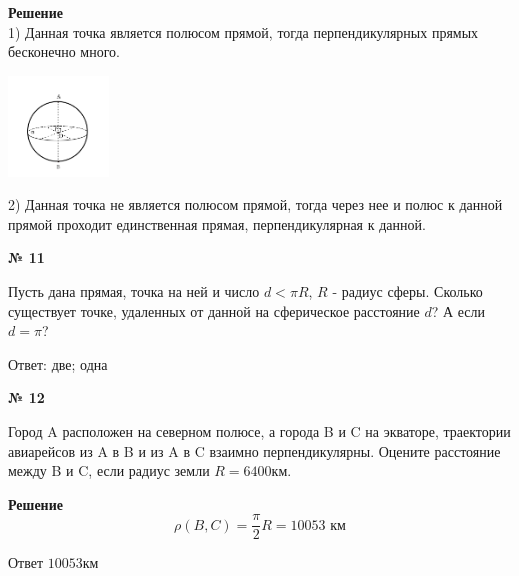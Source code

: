     \textbf{Решение}\\

    1) Данная точка является полюсом прямой, тогда перпендикулярных прямых бесконечно много.
     \begin{center}
        \includegraphics[width=0.2\textwidth]{images/img15}\\
    \end{center}

    2) Данная точка не является полюсом прямой, тогда через нее и полюс к данной прямой проходит
    единственная прямая, перпендикулярная к данной.

    \begin{center}
        \textbf{№ 11}
    \end{center}

    Пусть дана прямая, точка на ней и число $d < \pi R$, $R$ - радиус сферы.
    Сколько существует точке, удаленных от данной на сферическое расстояние $d$?
    А если $d = \pi$?

    Ответ: две; одна

    \begin{center}
        \textbf{№ 12}
    \end{center}

    Город A расположен на северном полюсе, а города B и C на экваторе,
    траектории авиарейсов из A в B и из A в C взаимно перпендикулярны.
    Оцените расстояние между B и C, если радиус земли $R = 6400$км.

    \textbf{Решение}\\

    \[
        \rho(B, C) = \frac{\pi}{2}R = 10053 \text{ км}
    \]

    Ответ $10053$км

